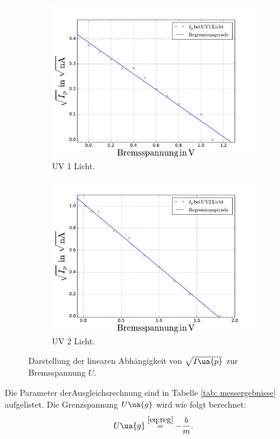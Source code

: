 \begin{figure}
  \centering
  \begin{subfigure}{0.48\textwidth}
    \centering
    \includegraphics[width=1 \textwidth]{../Messdaten/uv_eins.pdf}
    \caption{UV 1 Licht.}
    \label{fig: uv_eins}
  \end{subfigure}
  \begin{subfigure}{0.48\textwidth}
    \centering
    \includegraphics[width=1 \textwidth]{../Messdaten/uv_zwei.pdf}
    \caption{UV 2 Licht.}
    \label{fig: uv_zwei}
  \end{subfigure}
  \caption{Darstellung der linearen Abhängigkeit von $\sqrt{I\ua{p}}$ zur Bremsspannung $U$.}
  \label{fig: darstellung_3}
\end{figure}
Die Parameter derAusgleichsrechnung sind in Tabelle %
\ref{tab: messergebnisse} aufgelistet. Die Grenzspannung $U\ua{g}$ wird
wie folgt berechnet:
\begin{equation}
  \label{eq:ug}
  U\ua{g}\overset{\ref{eq:reg}}{=}-\frac{b}{m}.
\end{equation}

\FloatBarrier
